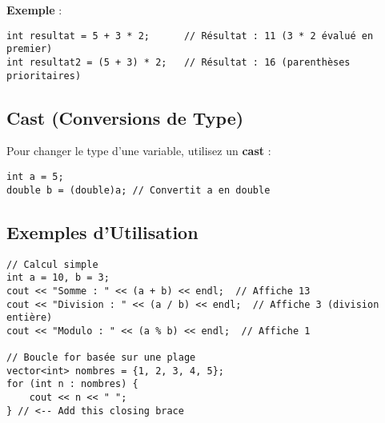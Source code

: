 \textbf{Exemple} :
\begin{tcolorbox}[colframe=blue!50!black, colback=blue!5!white, title=Exemple de Priorité des Opérateurs]
\begin{verbatim}
int resultat = 5 + 3 * 2;      // Résultat : 11 (3 * 2 évalué en premier)
int resultat2 = (5 + 3) * 2;   // Résultat : 16 (parenthèses prioritaires)
\end{verbatim}
\end{tcolorbox}

\subsection{ Cast (Conversions de Type)}
Pour changer le type d'une variable, utilisez un \textbf{cast} :
\begin{tcolorbox}[colframe=blue!50!black, colback=blue!5!white, title=Exemple de Cast]
\begin{verbatim}
int a = 5;
double b = (double)a; // Convertit a en double
\end{verbatim}
\end{tcolorbox}

\subsection{ Exemples d'Utilisation}
\begin{tcolorbox}[colframe=blue!50!black, colback=blue!5!white, title=Exemples d'Utilisation]
\begin{verbatim}
// Calcul simple
int a = 10, b = 3;
cout << "Somme : " << (a + b) << endl;  // Affiche 13
cout << "Division : " << (a / b) << endl;  // Affiche 3 (division entière)
cout << "Modulo : " << (a % b) << endl;  // Affiche 1

// Boucle for basée sur une plage
vector<int> nombres = {1, 2, 3, 4, 5};
for (int n : nombres) {
    cout << n << " ";
} // <-- Add this closing brace
\end{verbatim}
\end{tcolorbox}